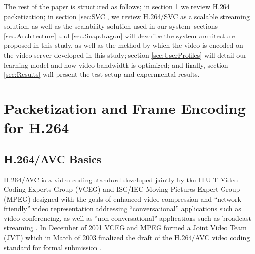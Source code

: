\documentclass[a4paper,12pt]{article}
\begin{document}
The rest of the paper is structured as follows; in section \ref{sec:Packetization} we review H.264 packetization; in section \ref{sec:SVC}, we review H.264/SVC as a scalable streaming solution, as well as the scalability solution used in our system; sections \ref{sec:Architecture} and \ref{sec:Snapdragon} will describe the system architecture proposed in this study, as well as the method by which the video is encoded  on the video server  developed in this study; section \ref{sec:UserProfiles} will detail our learning model and how video bandwidth is optimized; and finally, section \ref{sec:Results} will present the test setup and experimental results.


\section{Packetization and Frame Encoding for H.264}
\label{sec:Packetization}

\subsection{H.264/AVC Basics}

H.264/AVC is a video coding standard developed jointly by the ITU-T Video Coding Experts Group (VCEG) and ISO/IEC Moving Pictures Expert Group (MPEG) designed with the goals of enhanced video compression and ``network friendly'' video representation addressing ``conversational'' applications such as video conferencing, as well as ``non-conversational'' applications such as broadcast streaming \cite{H264AVCOverview}. In December of 2001 VCEG and MPEG formed a Joint Video Team (JVT) which in March of 2003 finalized the draft of the H.264/AVC video coding standard for formal submission \cite{H264AVCOverview}. 
\end{document}
